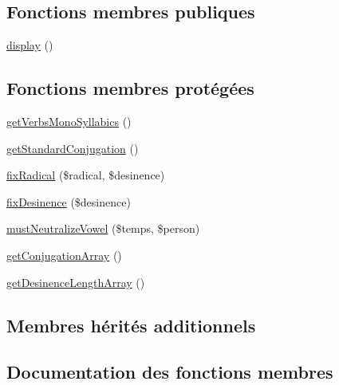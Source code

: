 \subsection*{Fonctions membres publiques}
\begin{DoxyCompactItemize}
\item 
\hyperlink{class_conjugation_gascon_third_group_aded79025318b9257b1e78eb56b83408a}{display} ()
\end{DoxyCompactItemize}
\subsection*{Fonctions membres protégées}
\begin{DoxyCompactItemize}
\item 
\hyperlink{class_conjugation_gascon_third_group_ae77d3521103e064d1166a896d78938cc}{get\+Verbs\+Mono\+Syllabics} ()
\item 
\hyperlink{class_conjugation_gascon_third_group_a5b658699da2a8e2c53406668483816be}{get\+Standard\+Conjugation} ()
\item 
\hyperlink{class_conjugation_gascon_third_group_a85f7883338561152e0493cf7902cfc75}{fix\+Radical} (\$radical, \$desinence)
\item 
\hyperlink{class_conjugation_gascon_third_group_a59ac06a6aa3030d98069f534ddea8398}{fix\+Desinence} (\$desinence)
\item 
\hyperlink{class_conjugation_gascon_third_group_ab70a4b2011631eb73f3c1e20ee3fe19b}{must\+Neutralize\+Vowel} (\$temps, \$person)
\item 
\hyperlink{class_conjugation_gascon_third_group_ab98edff3803ea21806d84b55e99b58fb}{get\+Conjugation\+Array} ()
\item 
\hyperlink{class_conjugation_gascon_third_group_aca29f03d35cb95b12858698faf6d9a55}{get\+Desinence\+Length\+Array} ()
\end{DoxyCompactItemize}
\subsection*{Membres hérités additionnels}


\subsection{Documentation des fonctions membres}
\hypertarget{class_conjugation_gascon_third_group_aded79025318b9257b1e78eb56b83408a}{}\label{class_conjugation_gascon_third_group_aded79025318b9257b1e78eb56b83408a} 

